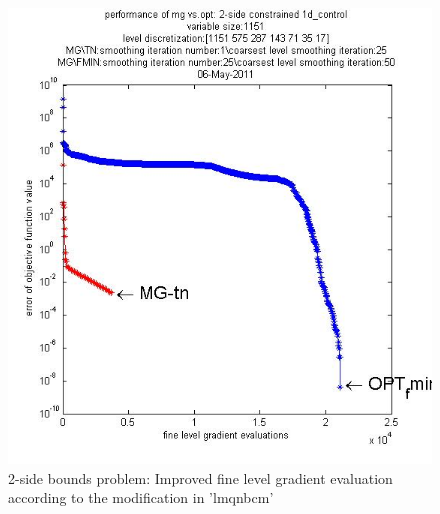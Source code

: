 \documentclass[10pt]{article}
\begin{document}
\begin{figure}[h]
\centering
  \includegraphics[width=1.0\textwidth]{2-side-evalgrad.jpg}
  \caption{2-side bounds problem:  Improved fine level gradient evaluation according to the modification in 'lmqnbcm'}
\label{fig:2side}
\end{figure}
\end{document}

